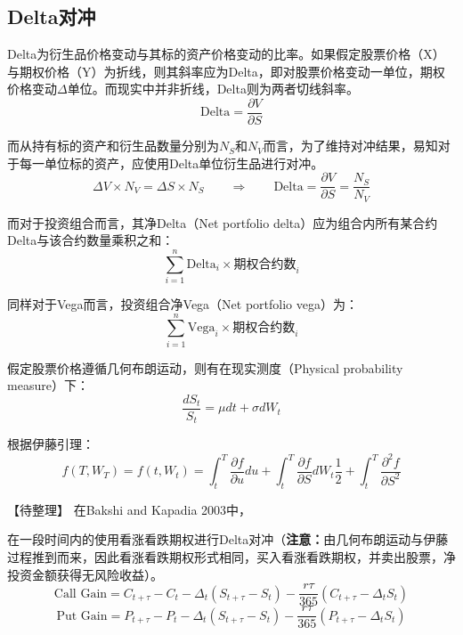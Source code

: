 \documentclass[11pt]{article}
\begin{document}
\subsection{Delta对冲}

Delta为衍生品价格变动与其标的资产价格变动的比率。如果假定股票价格（X）与期权价格（Y）为折线，则其斜率应为Delta，即对股票价格变动一单位，期权价格变动$\Delta$单位。而现实中并非折线，Delta则为两者切线斜率。
\begin{equation*}
    \text{Delta} = \frac{\partial V}{\partial S}
\end{equation*}

而从持有标的资产和衍生品数量分别为$N_S$和$N_V$而言，为了维持对冲结果，易知对于每一单位标的资产，应使用Delta单位衍生品进行对冲。
\begin{equation*}
    \Delta V \times N_V = \Delta S \times N_S \qquad \Rightarrow \qquad
    \text{Delta} = \frac{\partial V}{\partial S} = \frac{N_S}{N_V}
\end{equation*}

而对于投资组合而言，其净Delta（Net portfolio delta）应为组合内所有某合约Delta与该合约数量乘积之和：
\begin{equation*}
    \sum_{i=1}^{n} \text{Delta}_i \times \text{期权合约数}_i
\end{equation*}

同样对于Vega而言，投资组合净Vega（Net portfolio vega）为：
\begin{equation*}
    \sum_{i=1}^{n} \text{Vega}_i \times \text{期权合约数}_i
\end{equation*}

假定股票价格遵循几何布朗运动，则有在现实测度（Physical probability measure）下：
\begin{equation*}
    \frac{dS_t}{S_t} = \mu dt + \sigma dW_t
\end{equation*}

根据伊藤引理：
\begin{equation*}
    f(T,W_T) =f(t,W_t) = \int^T_t \frac{\partial f}{\partial u}du + \int^T_t \frac{\partial f}{\partial S} dW_t \frac{1}{2} + \int^T_t\frac{\partial ^2 f}{\partial S^2} 
\end{equation*}

【待整理】 在Bakshi and Kapadia 2003中，

在一段时间内的使用看涨看跌期权进行Delta对冲（\textbf{注意：}由几何布朗运动与伊藤过程推到而来，因此看涨看跌期权形式相同，买入看涨看跌期权，并卖出股票，净投资金额获得无风险收益）。
\begin{equation*}
    \text{Call Gain} = C_{t+\tau} - C_t - \Delta_t ( S_{t+\tau}-S_t) - \frac{r\tau}{365}(C_{t+\tau} - \Delta_t S_t)
\end{equation*}
\begin{equation*}
    \text{Put Gain} = P_{t+\tau} - P_t - \Delta_t ( S_{t+\tau}-S_t) - \frac{r\tau}{365}(P_{t+\tau} - \Delta_t S_t)
\end{equation*}
\end{document}
